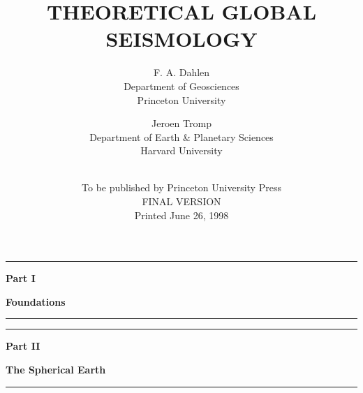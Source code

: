 \documentclass[fleqn,openany]{book}
\begin{document}
\begin{CJK*}{UTF8}{gkai} 



\title{THEORETICAL GLOBAL SEISMOLOGY}
\author{F. A. Dahlen\\
Department of Geosciences\\
Princeton University\\
\and
Jeroen Tromp\\
Department of Earth \& Planetary Sciences\\
Harvard University \\ \\
}
\date{To be published by Princeton University Press \\
FINAL VERSION\\
Printed June 26, 1998}
\maketitle

\setcounter{page}{5}
\tableofcontents
\newpage{\pagestyle{empty}\cleardoublepage}
%
%

\newpage{\pagestyle{empty}\cleardoublepage}
\thispagestyle{empty}
\vspace*{22mm}
\begin{center}
\rule{\linewidth}{0.5mm}
\end{center}
\begin{center}
\huge{\textbf{Part I}}
\end{center}
\begin{center}
\Huge{\textbf{Foundations}}
\rule{\linewidth}{0.5mm}
\end{center}
\newpage{\pagestyle{empty}\cleardoublepage}

%
%
%
%

%

\newpage{\pagestyle{empty}\cleardoublepage}
\thispagestyle{empty}
\vspace*{22mm}
\begin{center}
\rule{\linewidth}{0.5mm}
\end{center}
\begin{center}
\huge{\textbf{Part II}}
\end{center}
\begin{center}
\Huge{\textbf{The Spherical Earth}}
\rule{\linewidth}{0.5mm}
\end{center}
\newpage{\pagestyle{empty}\cleardoublepage}


\end{CJK*}
\end{document}
